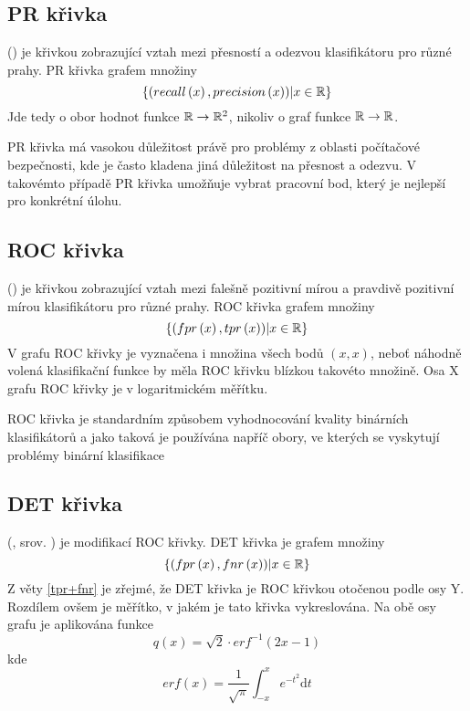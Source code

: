 \subsection{PR křivka}
 () je křivkou zobrazující vztah mezi přesností a odezvou klasifikátoru pro různé prahy. PR křivka grafem množiny
\[ \left\{ \left( recall \left( x \right), precision \left( x \right) \right) \middle| x \in \mathbb R \right\} \]
Jde tedy o obor hodnot funkce \( \mathbb R \to \mathbb R^2 \), nikoliv o graf funkce \( \mathbb R \to \mathbb R \).

PR křivka má vasokou důležitost právě pro problémy z oblasti počítačové bezpečnosti, kde je často kladena jiná důležitost na přesnost a odezvu. V takovémto případě PR křivka umožňuje vybrat pracovní bod, který je nejlepší pro konkrétní úlohu.

\subsection{ROC křivka}
 () je křivkou zobrazující vztah mezi falešně pozitivní mírou a pravdivě pozitivní mírou klasifikátoru pro různé prahy. ROC křivka grafem množiny
\[ \left\{ \left( fpr \left( x \right), tpr \left( x \right) \right) \middle| x \in \mathbb R \right\} \]
V grafu ROC křivky je vyznačena i množina všech bodů \( \left( x, x \right) \), neboť náhodně volená klasifikační funkce by měla ROC křivku blízkou takovéto množině. Osa X grafu ROC křivky je v logaritmickém měřítku.

ROC křivka je standardním způsobem vyhodnocování kvality binárních klasifikátorů a jako taková je používána napříč obory, ve kterých se vyskytují problémy binární klasifikace

\subsection{DET křivka}
 (, srov. \cite{martin_det_1997}) je modifikací ROC křivky. DET křivka je grafem množiny
\[ \left\{ \left( fpr \left( x \right), fnr \left( x \right) \right) \middle| x \in \mathbb R \right\} \]
Z věty \ref{tpr+fnr} je zřejmé, že DET křivka je ROC křivkou otočenou podle osy Y. Rozdílem ovšem je měřítko, v jakém je tato křivka vykreslována. Na obě osy grafu je aplikována funkce
\[ q \left( x \right) = \sqrt{2} \cdot erf^{-1} \left( 2x - 1 \right) \]
kde
\[ erf \left( x \right) = \frac{1}{\sqrt{\pi}} \int_{-x}^{x} e^{-t^2} \mathrm{d} t \]

